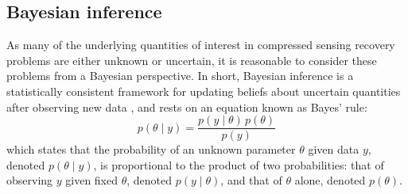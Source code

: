 \documentclass[final,5p,times,twocolumn]{elsarticle}
\begin{document}
\subsection{Bayesian inference}
\label{ss:bayes}
As many of the underlying quantities of interest in compressed sensing
recovery problems are either unknown or uncertain, it is reasonable to
consider these problems from a Bayesian perspective. In short, Bayesian
inference is a statistically consistent framework for updating beliefs
about uncertain quantities after observing new data \cite{ohagan2004},
and rests on an equation known as Bayes' rule:
\begin{equation}
p(\theta \mid y) =
 \frac{p(y \mid \theta) \, p(\theta)}{p(y)}
\label{eq:bayes_rule}
\end{equation}
which states that the probability of an unknown parameter $\theta$ given
data $y$, denoted $p(\theta \mid y)$, is proportional to the product of
two probabilities: that of observing $y$ given fixed $\theta$, denoted
$p(y \mid \theta)$, and that of $\theta$ alone, denoted $p(\theta)$.
\end{document}
